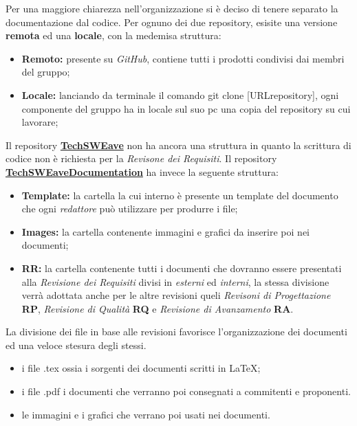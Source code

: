         Per una maggiore chiarezza nell'organizzazione si è deciso di tenere separato la documentazione dal codice.
        Per ognuno dei due repository, esisite una versione \textbf{remota} ed una \textbf{locale}, con la medemisa struttura: 
        \begin{itemize}
            \item \textbf{Remoto:} presente su \textit{GitHub}, contiene tutti i prodotti condivisi dai membri del gruppo;
            \item \textbf{Locale:} lanciando da terminale il comando {\selectfont git clone [URLrepository]}, ogni componente del gruppo ha in locale sul suo pc una copia del repository su cui lavorare;
        \end{itemize} 
        Il repository \textbf{\href{https://github.com/techsweave/TechSWEave.git}{TechSWEave}} non ha ancora una struttura in quanto la scrittura di codice non è richiesta per la \textit{Revisone dei Requisiti}. 
        Il repository  \textbf{\href{https://github.com/techsweave/TechSWEaveDocumentation.git}{TechSWEaveDocumentation}} ha invece la seguente struttura:
        \begin{itemize}
            \item \textbf{Template:} la cartella la cui interno è presente un template del documento che ogni \textit{redattore} può utilizzare per produrre i file;
            \item \textbf{Images:} la cartella contenente immagini e grafici da inserire poi nei documenti;
            \item \textbf{RR:} la cartella contenente tutti i documenti che dovranno essere presentati alla \textit{Revisione dei Requisiti} divisi in \textit{esterni} ed \textit{interni}, la stessa divisione verrà adottata anche per le altre revisioni queli \textit{Revisoni di Progettazione} \textbf{RP}, \textit{Revisione di Qualità} \textbf{RQ} e \textit{Revisione di Avanzamento} \textbf{RA}.
        \end{itemize}
        La divisione dei file in base alle revisioni favorisce l'organizzazione dei documenti ed una veloce stesura degli stessi.
        \begin{itemize}
            \item i file {\selectfont .tex} ossia i sorgenti dei documenti scritti in \LaTeX;
            \item i file {\selectfont .pdf} i documenti che verranno poi consegnati a commitenti e proponenti.
            \item le immagini e i grafici che verrano poi usati nei documenti.
        \end{itemize}
